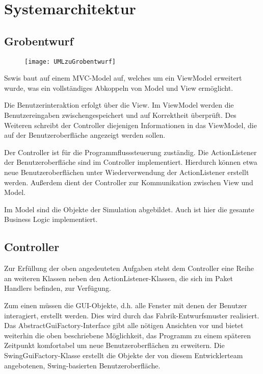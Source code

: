 \section{Systemarchitektur}

\subsection{Grobentwurf}

\begin{figure}[H] 
  \centering
     \texttt{[image: UMLzuGrobentwurf]}
\end{figure}

Sswis baut auf einem MVC-Model auf, welches um ein ViewModel erweitert wurde, was ein vollständiges Abkoppeln von Model und View ermöglicht.

Die Benutzerinteraktion erfolgt über die View. Im ViewModel werden die Benutzereingaben zwischengespeichert und auf Korrektheit überprüft. Des Weiteren schreibt der Controller diejenigen Informationen in das ViewModel, die auf der Benutzeroberfläche angezeigt werden sollen.

Der Controller ist für die Programmflusssteuerung zuständig. Die ActionListener der Benutzeroberfläche sind im Controller implementiert. Hierdurch können etwa neue Benutzeroberflächen unter Wiederverwendung der ActionListener erstellt werden.
Außerdem dient der Controller zur Kommunikation zwischen View und Model.

Im Model sind die Objekte der Simulation abgebildet. Auch ist hier die gesamte Business Logic implementiert.

\subsection{Controller}

\noindent
{}

Zur Erfüllung der oben angedeuteten Aufgaben steht dem Controller eine Reihe an weiteren Klassen neben den ActionListener-Klassen, die sich im Paket Handlers befinden, zur Verfügung.

Zum einen müssen die GUI-Objekte, d.h. alle Fenster mit denen der Benutzer interagiert, erstellt werden. Dies wird durch das Fabrik-Entwurfsmuster realisiert. Das AbstractGuiFactory-Interface gibt alle nötigen Ansichten vor und bietet weiterhin die oben beschriebene Möglichkeit, das Programm zu einem späteren Zeitpunkt komfortabel um neue Benutzeroberflächen zu erweitern.
Die SwingGuiFactory-Klasse erstellt die Objekte der von diesem Entwicklerteam angebotenen, Swing-basierten Benutzeroberfläche.

